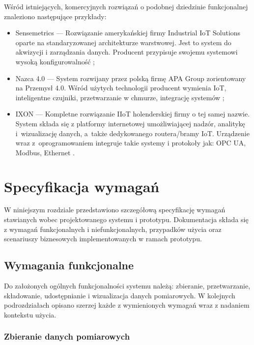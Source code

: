 \documentclass[a4paper, 12pt, twoside]{article}
\begin{document}
Wśród istniejących, komercyjnych rozwiązań o podobnej dziedzinie funkcjonalnej
znaleziono następujące przykłady:
\begin{itemize}
      \itemsep0em
      \item Sensemetrics --- Rozwiązanie amerykańskiej firmy Industrial IoT Solutions
            oparte na standaryzowanej architekturze warstwowej. Jest to system do akwizycji
            i zarządzania danych. Producent przypisuje swojemu systemowi wysoką konfigurowalność \cite{sensmetrics};
      \item Nazca 4.0 --- System rozwijany przez polską firmę APA Group zorientowany na Przemysł 4.0.
            Wśród użytych technologii producent wymienia IoT, inteligentne czujniki,
            przetwarzanie w chmurze, integrację systemów \cite{nazca};
      \item IXON --- Kompletne rozwiązanie IIoT holenderskiej firmy o tej samej nazwie.
            System składa się z platformy internetowej umożliwiającej nadzór, analitykę i~wizualizację danych,
            a~także dedykowanego routera/bramy IoT. Urządzenie wraz z~oprogramowaniem
            integruje takie systemy i protokoły jak: OPC UA, Modbus, Ethernet \cite{ixon}.
\end{itemize}


\section{Specyfikacja wymagań}\label{wymagania}

W niniejszym rozdziale przedstawiono szczegółową specyfikację wymagań
stawianych wobec projektowanego systemu i prototypu. Dokumentacja składa się
z wymagań funkcjonalnych i niefunkcjonalnych, przypadków użycia oraz scenariuszy
biznesowych implementowanych w ramach prototypu.

\subsection{Wymagania funkcjonalne}

Do założonych ogólnych funkcjonalności systemu należą: zbieranie, przetwarzanie,
składowanie, udostępnianie i wizualizacja danych pomiarowych. W kolejnych
podrozdziałach opisano szerzej każde z wymienionych wymagań wraz z nadaniem kontekstu
użycia.

\subsubsection{Zbieranie danych pomiarowych}
\end{document}
